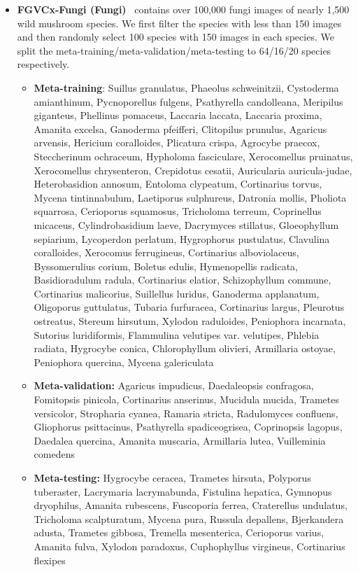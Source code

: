 \documentclass{article}
\begin{document}
\begin{itemize}[leftmargin=*]
\begin{itemize}
    \end{itemize}
    \item \textbf{FGVCx-Fungi (Fungi)}~\cite{Fungi} contains over 100,000 fungi images of nearly 1,500 wild mushroom species. We first filter the species with less than 150 images and then randomly select 100 species with 150 images in each species. We split the meta-training/meta-validation/meta-testing to 64/16/20 species respectively.
    \begin{itemize}
    \small
        \item \textbf{Meta-training}: Suillus granulatus, Phaeolus schweinitzii, Cystoderma amianthinum, Pycnoporellus fulgens, Psathyrella candolleana, Meripilus giganteus, Phellinus pomaceus, Laccaria laccata, Laccaria proxima, Amanita excelsa, Ganoderma pfeifferi, Clitopilus prunulus, Agaricus arvensis, Hericium coralloides, Plicatura crispa, Agrocybe praecox, Steccherinum ochraceum, Hypholoma fasciculare, Xerocomellus pruinatus, Xerocomellus chrysenteron, Crepidotus cesatii, Auricularia auricula-judae, Heterobasidion annosum, Entoloma clypeatum, Cortinarius torvus, Mycena tintinnabulum, Laetiporus sulphureus, Datronia mollis, Pholiota squarrosa, Cerioporus squamosus, Tricholoma terreum, Coprinellus micaceus, Cylindrobasidium laeve, Dacrymyces stillatus, Gloeophyllum sepiarium, Lycoperdon perlatum, Hygrophorus pustulatus, Clavulina coralloides, Xerocomus ferrugineus, Cortinarius alboviolaceus, Byssomerulius corium, Boletus edulis, Hymenopellis radicata, Basidioradulum radula, Cortinarius elatior, Schizophyllum commune, Cortinarius malicorius, Suillellus luridus, Ganoderma applanatum, Oligoporus guttulatus, Tubaria furfuracea, Cortinarius largus, Pleurotus ostreatus, Stereum hirsutum, Xylodon raduloides, Peniophora incarnata, Sutorius luridiformis, Flammulina velutipes var. velutipes, Phlebia radiata, Hygrocybe conica, Chlorophyllum olivieri, Armillaria ostoyae, Peniophora quercina, Mycena galericulata
        \item \textbf{Meta-validation:} Agaricus impudicus, Daedaleopsis confragosa, Fomitopsis pinicola, Cortinarius anserinus, Mucidula mucida, Trametes versicolor, Stropharia cyanea, Ramaria stricta, Radulomyces confluens, Gliophorus psittacinus, Psathyrella spadiceogrisea, Coprinopsis lagopus, Daedalea quercina, Amanita muscaria, Armillaria lutea, Vuilleminia comedens
        \item \textbf{Meta-testing:} Hygrocybe ceracea, Trametes hirsuta, Polyporus tuberaster, Lacrymaria lacrymabunda, Fistulina hepatica, Gymnopus dryophilus, Amanita rubescens, Fuscoporia ferrea, Craterellus undulatus, Tricholoma scalpturatum, Mycena pura, Russula depallens, Bjerkandera adusta, Trametes gibbosa, Tremella mesenterica, Cerioporus varius, Amanita fulva, Xylodon paradoxus, Cuphophyllus virgineus, Cortinarius flexipes
    \end{itemize}
\end{itemize}
\end{document}
